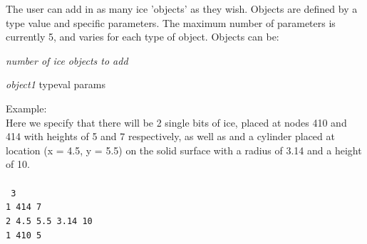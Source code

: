 The user can add in as many ice 'objects' as they wish. Objects are defined by a type value and specific parameters. The maximum number of parameters is currently 5, and varies for each type of object. Objects can be: 

\begin{table}[h!]
\end{table}


\begin{adescription} {}
\item[line 1:]        \emph{number of ice objects to add} 
\item[line 2-:]       \emph{object1}  typeval params  
\end{adescription}


Example:\\
Here we specify that there will be 2 single bits of ice, placed at nodes 410 and 414 with heights of 5 and 7 respectively, as well as and a cylinder placed at location (x = 4.5, y = 5.5) on the solid surface with a radius of 3.14 and a height of 10. \\\\
\texttt{
3\\
1 414 7 \\
2 4.5 5.5 3.14 10\\
1 410 5 \\
}
